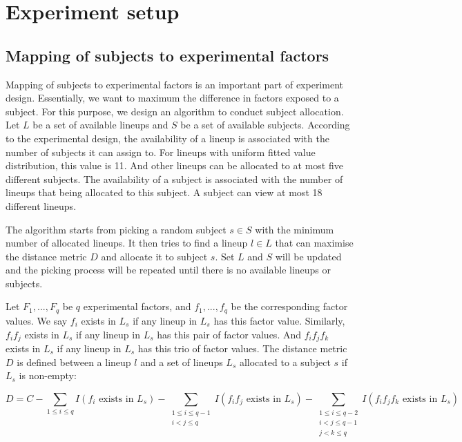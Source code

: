 \documentclass[]{interact}
\theoremstyle{plain}%
\theoremstyle{definition}
\theoremstyle{remark}
\begin{document}
\hypertarget{experiment-setup}{%
\section{Experiment setup}\label{experiment-setup}}

\hypertarget{mapping-of-subjects-to-experimental-factors}{%
\subsection{Mapping of subjects to experimental
factors}\label{mapping-of-subjects-to-experimental-factors}}

Mapping of subjects to experimental factors is an important part of
experiment design. Essentially, we want to maximum the difference in
factors exposed to a subject. For this purpose, we design an algorithm
to conduct subject allocation. Let \(L\) be a set of available lineups
and \(S\) be a set of available subjects. According to the experimental
design, the availability of a lineup is associated with the number of
subjects it can assign to. For lineups with uniform fitted value
distribution, this value is 11. And other lineups can be allocated to at
most five different subjects. The availability of a subject is
associated with the number of lineups that being allocated to this
subject. A subject can view at most 18 different lineups.

The algorithm starts from picking a random subject \(s \in S\) with the
minimum number of allocated lineups. It then tries to find a lineup
\(l \in L\) that can maximise the distance metric \(D\) and allocate it
to subject \(s\). Set \(L\) and \(S\) will be updated and the picking
process will be repeated until there is no available lineups or
subjects.

Let \(F_1,...,F_q\) be \(q\) experimental factors, and \(f_1, ...,f_q\)
be the corresponding factor values. We say \(f_i\) exists in \(L_{s}\)
if any lineup in \(L_{s}\) has this factor value. Similarly, \(f_if_j\)
exists in \(L_{s}\) if any lineup in \(L_{s}\) has this pair of factor
values. And \(f_if_jf_k\) exists in \(L_{s}\) if any lineup in \(L_{s}\)
has this trio of factor values. The distance metric \(D\) is defined
between a lineup \(l\) and a set of lineups \(L_{s}\) allocated to a
subject \(s\) if \(L_{s}\) is non-empty:

\footnotesize

\begin{equation*}
D =
C - \sum_{1\leq i \leq q}I(f_i\text{ exists in }L_{s}) - \sum_{\substack{1\leq i \leq q-1 \\ i < j \leq q}}I(f_if_j\text{ exists in }L_{s}) - \sum_{\substack{1\leq i \leq q - 2 \\ i < j \leq q - 1 \\ j < k \leq q}}I(f_if_jf_k\text{ exists in }L_{s})
\end{equation*}
\end{document}
